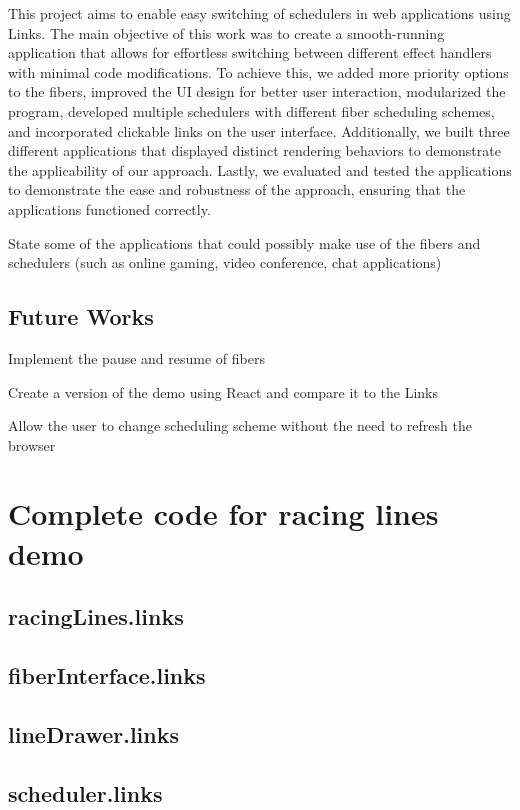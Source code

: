 \documentclass[logo,bsc,singlespacing,parskip]{infthesis}
\begin{document}
This project aims to enable easy switching of schedulers in web applications using Links. The main objective of this work was to create a smooth-running application that allows for effortless switching between different effect handlers with minimal code modifications. To achieve this, we added more priority options to the fibers, improved the UI design for better user interaction, modularized the program, developed multiple schedulers with different fiber scheduling schemes, and incorporated clickable links on the user interface. Additionally, we built three different applications that displayed distinct rendering behaviors to demonstrate the applicability of our approach. Lastly, we evaluated and tested the applications to demonstrate the ease and robustness of the approach, ensuring that the applications functioned correctly.

State some of the applications that could possibly make use of the fibers and schedulers (such as online gaming, video conference, chat applications)

\section{Future Works}

Implement the pause and resume of fibers

Create a version of the demo using React and compare it to the Links

Allow the user to change scheduling scheme without the need to refresh the browser





\appendix

\chapter{Complete code for racing lines demo}

\section{racingLines.links}
\section{fiberInterface.links}
\section{lineDrawer.links}
\section{scheduler.links}
\end{document}
